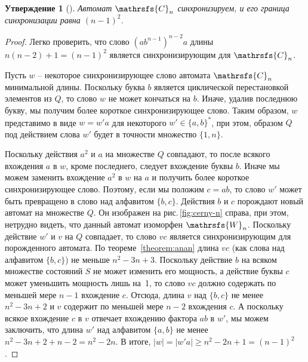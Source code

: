 \documentclass[11pt]{article}
\newcommand{\sw}{reset word}
\newcommand{\ssw}{reset word of minimum length}
\newtheorem{theorem}{Утверждение}
\begin{document}
\begin{theorem}[{\mdseries\cite[Лемма~1]{Ce64}}]
\label{theorem:cerny}
Автомат $\mathrsfs{C}_n$ синхронизируем, и его граница синхронизации равна $(n-1)^2$.
\end{theorem}

\begin{proof}
Легко проверить, что слово $(ab^{n-1})^{n-2}a$ длины
$n(n-2)+1=(n-1)^2$ является синхронизирующим для $\mathrsfs{C}_n$.


Пусть $w$ -- некоторое синхронизирующее слово автомата $\mathrsfs{C}_n$ 
минимальной длины. Поскольку буква $b$ является циклической перестановкой
элементов из $Q$, то слово $w$ не может кончаться на $b$.
Иначе, удалив последнюю букву, мы получим более короткое синхронизирующее
слово. Таким образом, $w$ представимо в виде $w = w'a$ для некоторого $w'\in\{a,b\}^*$,
при этом, образом $Q$ под действием слова $w'$ будет в точности множество $\{1,n\}$.


Поскольку действия $a^2$ и $a$ на множестве $Q$ совпадают, то после
всякого вхождения $a$ в $w$, кроме последнего, следует вхождение 
буквы $b$. Иначе мы можем заменить вхождение $a^2$ в $w$ на $a$
и получить более короткое синхронизирующее слово. Поэтому, если мы положим
$c=ab$, то слово $w'$ может быть превращено в слово над алфавитом $\{b,c\}$. 
Действия $b$ и $c$ порождают новый автомат на множестве $Q$. Он изображен
на рис.\,\ref{fig:cerny-n} справа, при этом, нетрудно видеть, что данный автомат
изоморфен $\mathrsfs{W}_n$. Поскольку действие $w'$ и $v$ на $Q$ совпадает, то
слово $vc$ является синхронизирующим для порожденного автомата. 
По теореме~\ref{theorem:anan} длина $vc$ (как слова над алфавитом $\{b,c\}$) 
не меньше $n^2-3n+3$. Поскольку действие $b$ на всяком множестве состояний $S$
не может изменить его мощность, а действие буквы $c$ может уменьшить мощность лишь на~1,
то слово $vc$ должно содержать по меньшей мере $n-1$ вхождение $c$. Отсюда,
длина $v$ над $\{b,c\}$ не менее $n^2-3n+2$ и $v$ содержит по меньшей мере $n-2$ 
вхождения $c$. А поскольку всякое вхождение $c$ в $v$ отвечает вхождению фактора $ab$ в $w'$, 
мы можем заключить, что длина $w'$ над алфавитом $\{a,b\}$ не менее $n^2-3n+2+n-2=n^2-2n$.
В итоге, $|w|=|w'a|\ge n^2-2n+1=(n-1)^2$.


\end{proof}
\end{document}
